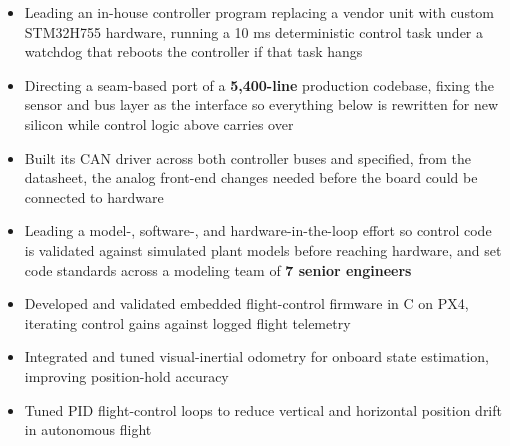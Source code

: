 \documentclass[10pt,letterpaper]{article}
\begin{document}
\bodyfont

\resumeheader
\educationsection




\orgline{\spartanracing}
\begin{itemize}
  \item Leading an in-house controller program replacing a vendor unit with custom STM32H755 hardware, running a 10 ms deterministic control task under a watchdog that reboots the controller if that task hangs
  \item Directing a seam-based port of a \textbf{5,400-line} production codebase, fixing the sensor and bus layer as the interface so everything below is rewritten for new silicon while control logic above carries over
  \item Built its CAN driver across both controller buses and specified, from the datasheet, the analog front-end changes needed before the board could be connected to hardware
  \item Leading a model-, software-, and hardware-in-the-loop effort so control code is validated against simulated plant models before reaching hardware, and set code standards across a modeling team of \textbf{7 senior engineers}
\end{itemize}

\entryspace

\begin{itemize}
  \item Developed and validated embedded flight-control firmware in C on PX4, iterating control gains against logged flight telemetry
  \item Integrated and tuned visual-inertial odometry for onboard state estimation, improving position-hold accuracy
  \item Tuned PID flight-control loops to reduce vertical and horizontal position drift in autonomous flight
\end{itemize}
\end{document}
